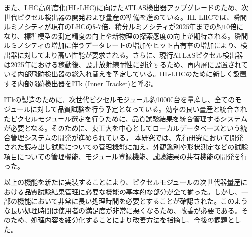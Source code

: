 また、LHC高輝度化(HL-LHC)に向けたATLAS検出器アップグレードのため、次世代ピクセル検出器の開発および量産の準備を進めている。HL-LHCでは、瞬間ルミノシティが現在のLHCの$5$-$7$倍、積分ルミノシティが$2025$年までの約$10$倍になり、標準模型の測定精度の向上や新物理の探索感度の向上が期待される。瞬間ルミノシティの増加に伴うデータレートの増加やヒット占有率の増加により、検出器に対してより高い性能が要求される。さらに、現行ATLASピクセル検出器は2025年における稼動後、設計放射線耐性に到達するため、再内層に設置されている内部飛跡検出器の総入れ替えを予定している。HL-LHCのために新しく設置する内部飛跡検出器をITk (Inner Tracker)と呼ぶ。

ITkの製造のために、次世代ピクセルモジュール約10000台を量産し、全てのモジュールに対して品質試験を行う予定となっている。効率の良い量産と統合されたピクセルモジュール選定を行うために、品質試験結果を統合管理するシステムが必要となる。そのために、東工大を中心としてローカルデータベースという統合管理システムの開発が進められている。
本研究では、先行研究において開発された読み出し試験についての管理機能に加え、外観鑑別や形状測定などの試験項目についての管理機能、モジュール登録機能、試験結果の共有機能の開発を行った。

以上の機能を新たに実装することにより、ピクセルモジュールの次世代器量産における品質試験結果管理に必要な機能の基本的な部分が全て揃った。しかし、一部の機能において非常に長い処理時間を必要とすることが確認された。このような長い処理時間は使用者の満足度が非常に悪くなるため、改善が必要である。そのため、処理内容を細分化することにより改善方法を指摘し、今後の課題とした。



%
